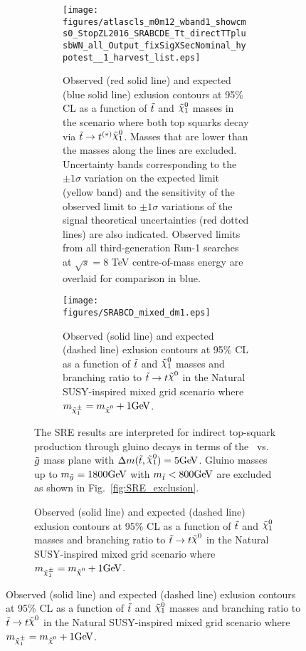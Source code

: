 \begin{figure}[htbp]
\begin{center}
\begin{figure}[htbp]
\begin{center}
{{{\begin{figure}[htpb]
  \begin{center} \texttt{[image: figures/atlascls\_m0m12\_wband1\_showcms0\_StopZL2016\_SRABCDE\_Tt\_directTTplusbWN\_all\_Output\_fixSigXSecNominal\_hypotest\_\_1\_harvest\_list.eps]}%
    \caption{Observed (red solid line) and expected (blue solid line)
      exlusion contours at 95\% CL as a function of $\tilde{t}$ and
      $\ninoone$ masses in the scenario where both top squarks decay
      via $\stop\to t^{(*)} \ninoone$. Masses that are lower than the masses along the lines are excluded. Uncertainty bands corresponding to the $\pm 1
      \sigma$ variation on the expected limit (yellow band) and the
      sensitivity of the observed limit to $\pm 1\sigma$ variations of
      the signal theoretical uncertainties (red dotted lines) are also
      indicated. Observed limits from all third-generation Run-1 searches~\cite{Atlas8TeVSummary} at $\sqrt{s}=8$ TeV centre-of-mass energy are overlaid for comparison in blue.}
    \label{fig:SRABC_exclusion}%
  \end{center}
\end{figure}

\begin{figure}[htpb]
  \begin{center}
    \texttt{[image: figures/SRABCD\_mixed\_dm1.eps]}
    \caption{Observed (solid line) and expected (dashed line) exlusion contours at 95\% CL as a function of $\tilde{t}$ and $\ninoone$ masses and branching ratio to $\stop\to t\LSP$ in the Natural SUSY-inspired mixed grid scenario where $m_{\chinoonepm}=\mLSP+1\gev$. %
}
    \label{fig:tbMet_exclusion}
  \end{center}
\end{figure}

The SRE results are interpreted for indirect top-squark production
through gluino decays in terms of the \stop\ vs.\ $\tilde{g}$ mass
plane with $\Delta m(\stop,\ninoone)=5\GeV$. 
Gluino masses up to $m_{\gluino}=1800\GeV$ with $\mstop<800\GeV$ are excluded as shown in Fig.~\ref{fig:SRE_exclusion}.


}}}
\end{center}
\end{figure}
\end{center}
\end{figure}
